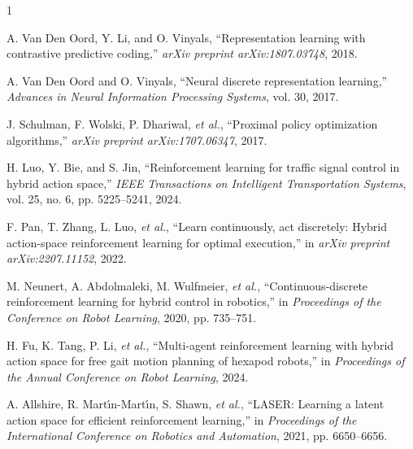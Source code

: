 \documentclass[letterpaper, 10 pt, conference]{ieeeconf}
\begin{document}
\begin{thebibliography}{1}

    A. Van Den Oord, Y. Li, and O. Vinyals, ``Representation learning with contrastive predictive coding,'' \emph{arXiv preprint arXiv:1807.03748}, 2018.

    A. Van Den Oord and O. Vinyals, ``Neural discrete representation learning,'' \emph{Advances in Neural Information Processing Systems}, vol. 30, 2017.

    J. Schulman, F. Wolski, P. Dhariwal, \textit{et al.}, ``Proximal policy optimization algorithms,'' \emph{arXiv preprint arXiv:1707.06347}, 2017.

    H. Luo, Y. Bie, and S. Jin, ``Reinforcement learning for traffic signal control in hybrid action space,'' \emph{IEEE Transactions on Intelligent Transportation Systems}, vol. 25, no. 6, pp. 5225--5241, 2024.

    F. Pan, T. Zhang, L. Luo, \textit{et al.}, ``Learn continuously, act discretely: Hybrid action-space reinforcement learning for optimal execution,'' in \emph{arXiv preprint arXiv:2207.11152}, 2022.

    M. Neunert, A. Abdolmaleki, M. Wulfmeier, \textit{et al.}, ``Continuous-discrete reinforcement learning for hybrid control in robotics,'' in \emph{Proceedings of the Conference on Robot Learning}, 2020, pp. 735--751.

    H. Fu, K. Tang, P. Li, \textit{et al.}, ``Multi-agent reinforcement learning with hybrid action space for free gait motion planning of hexapod robots,'' in \emph{Proceedings of the Annual Conference on Robot Learning}, 2024.


    A. Allshire, R. Mart{\'\i}n-Mart{\'\i}n, S. Shawn, \textit{et al.}, ``{{LASER}}: Learning a latent action space for efficient reinforcement learning,'' in \emph{Proceedings of the International Conference on Robotics and Automation}, 2021, pp. 6650--6656.


\end{thebibliography}
\end{document}
